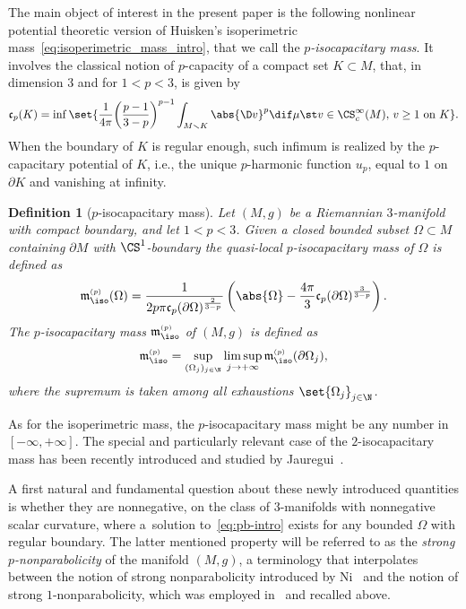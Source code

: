 \documentclass[10pt,a4paper]{amsart}
\numberwithin{equation}{section}
\newtheorem{Definition}[Theorem]{Definition}
\newcounter{case}
\renewcommand{\ncapa}{\mathfrak{c}}
\newcommand{\ma}{\mathfrak{m}}
\newcommand{\tp}[1][p]{{\text{\tiny$(#1)$}}}
\begin{document}
The main object of interest in the present paper is the following nonlinear potential theoretic version of Huisken's isoperimetric mass~\eqref{eq:isoperimetric_mass_intro}, that we call the {\em $p$-isocapacitary mass}. It involves the classical notion of $p$-capacity of a compact set $K \subset M$, that, in dimension $3$ and for $1 < p <3$, is given by
\begin{equation*}%
 \ncapa_p(K) = \inf \set{\frac{1}{4\pi}\bigg(\frac{p-1}{3-p}\bigg)^{p-1}\int_{M\smallsetminus K} \abs{\D v}^p \dif \mu\st v \in \CS_c^\infty(M),\, v \geq 1\text{ on } K}.
\end{equation*}
When the boundary of $K$ is regular enough, such infimum is realized by the $p$-capacitary potential of $K$, i.e., the unique $p$-harmonic function $u_p$, equal to $1$ on $\partial K$ and vanishing at infinity.
\begin{Definition}[$p$-isocapacitary mass]%
Let $(M,g)$ be a Riemannian $3$-manifold with compact boundary, and let $1<p<3$. Given a closed bounded subset $\Omega\subset M$ containing $\partial M$ with $\CS^{1}$-boundary the quasi-local $p$-isocapacitary mass of $\Omega$ is defined as
\begin{equation*}%
 \ma_{\iso}^{\tp}(\Omega)=\frac{1}{2p \pi \ncapa_p(\partial \Omega)^{\frac{2}{3-p}}}\left( \abs{\Omega} -\frac{4 \pi}{3} \ncapa_p (\partial \Omega)^\frac{3}{3-p}\right).
\end{equation*}
The $p$-isocapacitary mass $\ma^{\tp}_{\iso}$ of $(M,g)$ is defined as \begin{equation}\label{eq:isopcapacitary_mass}
 \ma_{\iso}^{\tp} = \sup_{(\Omega_j)_{j \in \N}} \limsup_{j \to +\infty} \ma_{\iso}^{\tp}(\partial \Omega_j),
\end{equation}
where the supremum is taken among all exhaustions $\set{\Omega_j}_{j\in \N}$.
\end{Definition}
As for the isoperimetric mass, the $p$-isocapacitary mass might be any number in $[-\infty,+\infty]$. The special and particularly relevant case of the $2$-isocapacitary mass has been recently introduced and studied by Jauregui~\cite{jauregui_admmasscapacityvolumedeficit_2020}.

A first natural and fundamental question about these newly introduced quantities is whether they are nonnegative, on the class of $3$-manifolds with nonnegative scalar curvature, where a~solution to~\eqref{eq:pb-intro} exists for any bounded $\Omega$ with regular boundary. The latter mentioned property will be referred to as the \textit{strong $p$-nonparabolicity} of the manifold $(M,g)$, a terminology that interpolates between the notion of strong nonparabolicity introduced by Ni~\cite{ni_meanvaluetheoremsmanifolds_2007} and the notion of strong $1$-nonparabolicity, which was employed in~\cite{benatti_isoperimetricriemannianpenroseinequality_2022} and recalled above.
\end{document}
